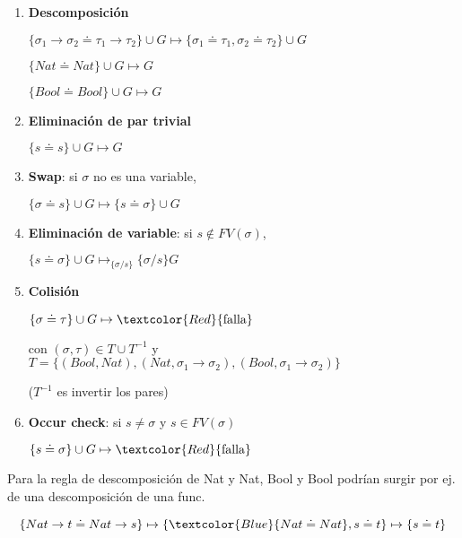 \documentclass{report}
\theoremstyle{definition} %
\newcommand{\tfunc}[2]{#1 \to #2}
\newcommand{\changed}[1]{\textcolor{Red}{#1}}
\newcommand{\select}[1]{\textcolor{Blue}{#1}}
\newcommand{\sustfor}[2]{#1/#2} %
\newcommand{\unify}[2]{#1 \doteq #2}
\newcommand{\simpSust}[1]{\mapsto_{#1}}
\newcommand{\simp}{\mapsto}
\begin{document}
\newcommand{\inferRule}[3]{ \{ \unify{#1}{#2} \} \cup G \simp #3}
\begin{enumerate}
    \item \textbf{Descomposición}

    $\inferRule
        {\tfunc{\sigma_1}{\sigma_2}}
        {\tfunc{\tau_1}{\tau_2}}
        {\{ \unify{\sigma_1}{\tau_1}, \unify{\sigma_2}{\tau_2} \} \cup G}
    $
    
    $\inferRule{Nat}{Nat}{G}$

    $\inferRule{Bool}{Bool}{G}$

    \item \textbf{Eliminación de par trivial}
    
    $\inferRule{s}{s}{G}$

    \item \textbf{Swap}: si $\sigma$ no es una variable,
    
    $\inferRule{\sigma}{s}{ \{ \unify{s}{\sigma} \} \cup G}$

    \item \textbf{Eliminación de variable}: si $s \notin FV(\sigma)$,
    
    $
        \{ \unify{s}{\sigma} \} \cup G
        \simpSust{\{ \sustfor{\sigma}{s}\}}
        \{\sustfor{\sigma}{s}\} G
    $

    \item \textbf{Colisión}
    
    $\inferRule{\sigma}{\tau}{\changed{\text{falla}}}$
    
    con $(\sigma, \tau) \in T \cup T^{-1}$ y
    $T = \{
        (Bool, Nat),
        (Nat, \tfunc{\sigma_1}{\sigma_2}),
        (Bool, \tfunc{\sigma_1}{\sigma_2})
    \}$

    ($T^{-1}$ es invertir los pares)

    \item \textbf{Occur check}: si $s \neq \sigma$ y $s \in FV(\sigma)$
    
    $\inferRule{s}{\sigma}{\changed{\text{falla}}}$
\end{enumerate}

Para la regla de descomposición de Nat y Nat, Bool y Bool podrían surgir por ej.
de una descomposición de una func.

\[
    \{ \unify{\tfunc{Nat}{t}}{\tfunc{Nat}{s}} \}
    \simp
    \{ \select{\unify{Nat}{Nat}}, \unify{s}{t} \}
    \simp
    \{ \unify{s}{t} \}
\]
\end{document}
